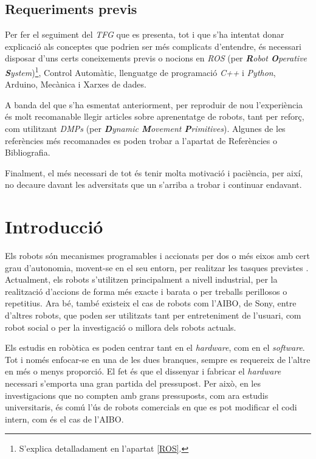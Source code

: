 \documentclass[12pt,a4paper,final,twoside]{report}
\begin{document}
\section*{Requeriments previs}
\label{Requeriments}

Per fer el seguiment del \textit{TFG} que es presenta, tot i que s'ha intentat donar explicació als conceptes que podrien ser més complicats d'entendre, és necessari disposar d'uns certs coneixements previs o nocions en \textit{ROS} (per \textit{\textbf{R}obot \textbf{O}perative \textbf{S}ystem})\footnote{S'explica detalladament en l'apartat \ref{ROS}.}, Control Automàtic, llenguatge de programació \textit{C++} i \textit{Python}, Arduino, Mecànica i Xarxes de dades.

A banda del que s'ha esmentat anteriorment, per reproduir de nou l'experiència és molt recomanable llegir articles sobre aprenentatge de robots, tant per reforç, com utilitzant \textit{DMPs} (per \textit{\textbf{D}ynamic \textbf{M}ovement \textbf{P}rimitives}). Algunes de les referències més recomanades es poden trobar a l'apartat de Referències o Bibliografia.

Finalment, el més necessari de tot és tenir molta motivació i paciència, per així, no decaure davant les adversitats que un s'arriba a trobar i continuar endavant.

\newpage

\chapter{Introducció}
\label{Introduccio}

Els robots són mecanismes programables i accionats per dos o més eixos amb cert grau d'autonomia, movent-se en el seu entorn, per realitzar les tasques previstes \cite{ISO_Robot}. Actualment, els robots s'utilitzen principalment a nivell industrial, per la realització d'accions de forma més exacte i barata o per treballs perillosos o repetitius. Ara bé, també existeix el cas de robots com l'AIBO, de Sony, entre d'altres robots, que poden ser utilitzats tant per entreteniment de l'usuari, com robot social o per la investigació o millora dels robots actuals.

Els estudis en robòtica es poden centrar tant en el \textit{hardware}, com en el \textit{software}. Tot i només enfocar-se en una de les dues branques, sempre es requereix de l'altre en més o menys proporció. El fet és que el dissenyar i fabricar el \textit{hardware} necessari s'emporta una gran partida del pressupost. Per això, en les investigacions que no compten amb grans pressuposts, com ara estudis universitaris, és comú l'ús de robots comercials en que es pot modificar el codi intern, com és el cas de l'AIBO.
\end{document}
